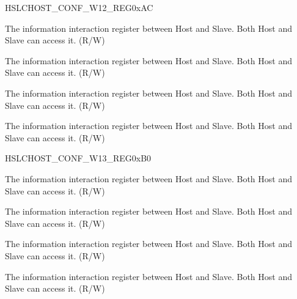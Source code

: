 \begin{register}{H}{SLCHOST\_CONF\_W12\_REG}{0xAC}\label{regdesc:SLCHOSTCONFW12REG}
%
%
%
%
\regnewline%
\begin{regdesc}\begin{reglist}
\item [SLCHOST\_CONF51]The information interaction register between Host and Slave. Both Host and Slave can access it. (R/W)
\item [SLCHOST\_CONF50]The information interaction register between Host and Slave. Both Host and Slave can access it. (R/W)
\item [SLCHOST\_CONF49]The information interaction register between Host and Slave. Both Host and Slave can access it. (R/W)
\item [SLCHOST\_CONF48]The information interaction register between Host and Slave. Both Host and Slave can access it. (R/W)
\end{reglist}\end{regdesc}
\end{register}


\begin{register}{H}{SLCHOST\_CONF\_W13\_REG}{0xB0}\label{regdesc:SLCHOSTCONFW13REG}
%
%
%
%
\regnewline%
\begin{regdesc}\begin{reglist}
\item [SLCHOST\_CONF55]The information interaction register between Host and Slave. Both Host and Slave can access it. (R/W)
\item [SLCHOST\_CONF54]The information interaction register between Host and Slave. Both Host and Slave can access it. (R/W)
\item [SLCHOST\_CONF53]The information interaction register between Host and Slave. Both Host and Slave can access it. (R/W)
\item [SLCHOST\_CONF52]The information interaction register between Host and Slave. Both Host and Slave can access it. (R/W)
\end{reglist}\end{regdesc}
\end{register}


